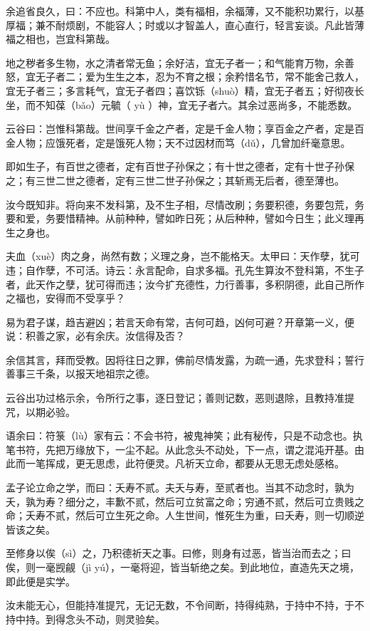 \documentclass[12pt,UTF8]{ctexbook}
\begin{document}
余追省良久，曰：不应也。科第中人，类有福相，余福薄，又不能积功累行，以基厚福；兼不耐烦剧，不能容人；时或以才智盖人，直心直行，轻言妄谈。凡此皆薄福之相也，岂宜科第哉。

地之秽者多生物，水之清者常无鱼；余好洁，宜无子者一；和气能育万物，余善怒，宜无子者二；爱为生生之本，忍为不育之根；余矜惜名节，常不能舍己救人，宜无子者三；多言耗气，宜无子者四；喜饮铄（shuò）精，宜无子者五；好彻夜长坐，而不知葆（bǎo）元毓（ yù ）神，宜无子者六。其余过恶尚多，不能悉数。

云谷曰：岂惟科第哉。世间享千金之产者，定是千金人物；享百金之产者，定是百金人物；应饿死者，定是饿死人物；天不过因材而笃（dǔ），几曾加纤毫意思。

即如生子，有百世之德者，定有百世子孙保之；有十世之德者，定有十世子孙保之；有三世二世之德者，定有三世二世子孙保之；其斩焉无后者，德至薄也。

汝今既知非。将向来不发科第，及不生子相，尽情改刷；务要积德，务要包荒，务要和爱，务要惜精神。从前种种，譬如昨日死；从后种种，譬如今日生；此义理再生之身也。

夫血（xuè）肉之身，尚然有数；义理之身，岂不能格天。太甲曰：天作孽，犹可违；自作孽，不可活。诗云：永言配命，自求多福。孔先生算汝不登科第，不生子者，此天作之孽，犹可得而违；汝今扩充德性，力行善事，多积阴德，此自己所作之福也，安得而不受享乎？

易为君子谋，趋吉避凶；若言天命有常，吉何可趋，凶何可避？开章第一义，便说：积善之家，必有余庆。汝信得及否？

余信其言，拜而受教。因将往日之罪，佛前尽情发露，为疏一通，先求登科；誓行善事三千条，以报天地祖宗之德。

云谷出功过格示余，令所行之事，逐日登记；善则记数，恶则退除，且教持准提咒，以期必验。

语余曰：符箓（lù）家有云：不会书符，被鬼神笑；此有秘传，只是不动念也。执笔书符，先把万缘放下，一尘不起。从此念头不动处，下一点，谓之混沌开基。由此而一笔挥成，更无思虑，此符便灵。凡祈天立命，都要从无思无虑处感格。

孟子论立命之学，而曰：夭寿不贰。夫夭与寿，至贰者也。当其不动念时，孰为夭，孰为寿？细分之，丰歉不贰，然后可立贫富之命；穷通不贰，然后可立贵贱之命；夭寿不贰，然后可立生死之命。人生世间，惟死生为重，曰夭寿，则一切顺逆皆该之矣。

至修身以俟（sì）之，乃积德祈天之事。曰修，则身有过恶，皆当治而去之；曰俟，则一毫觊觎（jì yú），一毫将迎，皆当斩绝之矣。到此地位，直造先天之境，即此便是实学。

汝未能无心，但能持准提咒，无记无数，不令间断，持得纯熟，于持中不持，于不持中持。到得念头不动，则灵验矣。
\end{document}
